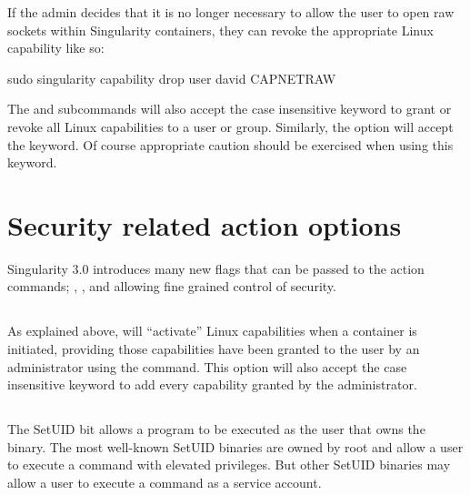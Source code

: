 \documentclass[letterpaper,10pt,english]{sphinxmanual}
\begin{document}
If the admin decides that it is no longer necessary to allow the user 
to open raw sockets within Singularity containers, they can revoke the
appropriate Linux capability like so:

%
\begin{sphinxVerbatim}[commandchars=\\\{\}]
\PYGZdl{} sudo singularity capability drop \PYGZhy{}\PYGZhy{}user david CAP\PYGZus{}NET\PYGZus{}RAW
\end{sphinxVerbatim}

The  and  subcommands will also accept the case
insensitive keyword  to grant or revoke all Linux capabilities to a user
or group.  Similarly, the  option will accept the  keyword.
Of course appropriate caution should be exercised when using this keyword.


\section{Security related action options}
\label{\detokenize{security_options:security-related-action-options}}
Singularity 3.0 introduces many new flags that can be passed to the action
commands; , , and  allowing fine grained control of
security.


\subsection{}
\label{\detokenize{security_options:add-caps}}
As explained above,  will “activate” Linux capabilities when a
container is initiated, providing those capabilities have been granted to the
user by an administrator using the  command. This option will
also accept the case insensitive keyword  to add every capability
granted by the administrator.


\subsection{}
\label{\detokenize{security_options:allow-setuid}}
The SetUID bit allows a program to be executed as the user that owns the binary.
The most well-known SetUID binaries are owned by root and allow a user to
execute a command with elevated privileges.  But other SetUID binaries may
allow a user to execute a command as a service account.
\end{document}
